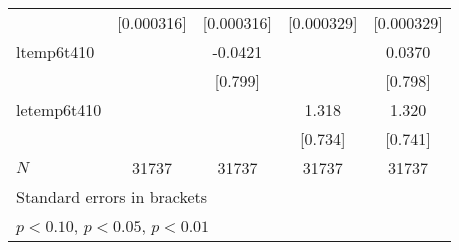 {\begin{tabular}{l*{4}{c}}
            &  [0.000316]         &  [0.000316]         &  [0.000329]         &  [0.000329]         \\
[1em]
ltemp6t410  &                     &     -0.0421         &                     &      0.0370         \\
            &                     &     [0.799]         &                     &     [0.798]         \\
[1em]
letemp6t410 &                     &                     &       1.318\sym{*}  &       1.320\sym{*}  \\
            &                     &                     &     [0.734]         &     [0.741]         \\
\hline
\(N\)       &       31737         &       31737         &       31737         &       31737         \\
\hline\hline
\multicolumn{5}{l}{\footnotesize Standard errors in brackets}\\
\multicolumn{5}{l}{\footnotesize \sym{*} \(p<0.10\), \sym{**} \(p<0.05\), \sym{***} \(p<0.01\)}\\
\end{tabular}
}
